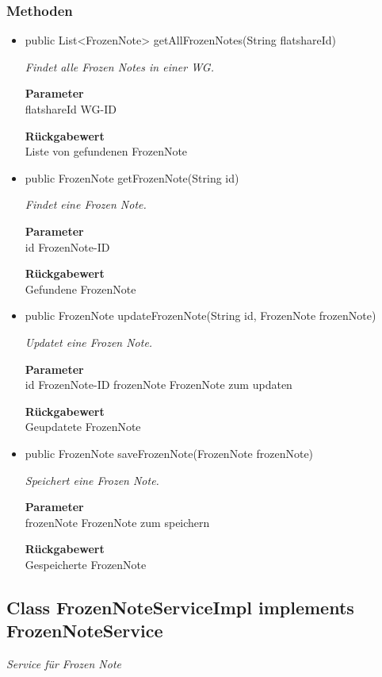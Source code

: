 \documentclass[a4paper]{scrreprt}
\begin{document}
        \subsubsection{Methoden}
        \begin{itemize}
        	\item{public List<FrozenNote> getAllFrozenNotes(String flatshareId)}
        	
        	\textit{Findet alle Frozen Notes in einer WG.}
        	
        	\textbf{Parameter} \\
        	flatshareId WG-ID
        	
        	\textbf{Rückgabewert} \\
        	Liste von gefundenen FrozenNote        \item{public FrozenNote getFrozenNote(String id)}
        	
        	\textit{Findet eine Frozen Note.}
        	
        	\textbf{Parameter} \\
        	id FrozenNote-ID
        	
        	\textbf{Rückgabewert} \\
        	Gefundene FrozenNote        \item{public FrozenNote updateFrozenNote(String id, FrozenNote frozenNote)}
        	
        	\textit{Updatet eine Frozen Note.}
        	
        	\textbf{Parameter} \\
        	id FrozenNote-ID
        	frozenNote FrozenNote zum updaten
        	
        	\textbf{Rückgabewert} \\
        	Geupdatete FrozenNote        \item{public FrozenNote saveFrozenNote(FrozenNote frozenNote)}
        	
        	\textit{Speichert eine Frozen Note.}
        	
        	\textbf{Parameter} \\
        	frozenNote FrozenNote zum speichern
        	
        	\textbf{Rückgabewert} \\
        	Gespeicherte FrozenNote
        \end{itemize}
        \subsection{Class FrozenNoteServiceImpl implements FrozenNoteService}
        \textit{Service für Frozen Note}
\end{document}
